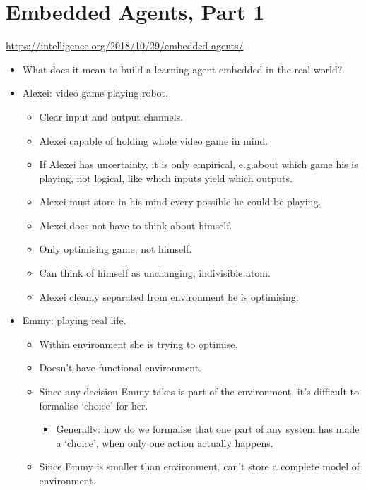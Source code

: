 \section{Embedded Agents, Part 1}

\url{https://intelligence.org/2018/10/29/embedded-agents/}

\begin{itemize}
    \item What does it mean to build a learning agent embedded in the real world?
    \item Alexei: video game playing robot.
    \begin{itemize}
        \item Clear input and output channels.
        \item Alexei capable of holding whole video game in mind.
        \item If Alexei has uncertainty, it is only empirical, e.g.\@ about which game his is playing, not logical, like which inputs yield which outputs.
        \item Alexei must store in his mind every possible he could be playing.
        \item Alexei does not have to think about himself.
        \item Only optimising game, not himself.
        \item Can think of himself as unchanging, indivisible atom.
        \item Alexei cleanly separated from environment he is optimising.
    \end{itemize}
    \item Emmy: playing real life.
    \begin{itemize}
        \item Within environment she is trying to optimise.
        \item Doesn't have functional environment.
        \item Since any decision Emmy takes is part of the environment, it's difficult to formalise `choice' for her.
        \begin{itemize}
            \item Generally: how do we formalise that one part of any system has made a `choice', when only one action actually happens.
        \end{itemize}
        \item Since Emmy is smaller than environment, can't store a complete model of environment.
        \begin{itemize}

\end{itemize}
\end{itemize}
\end{itemize}
